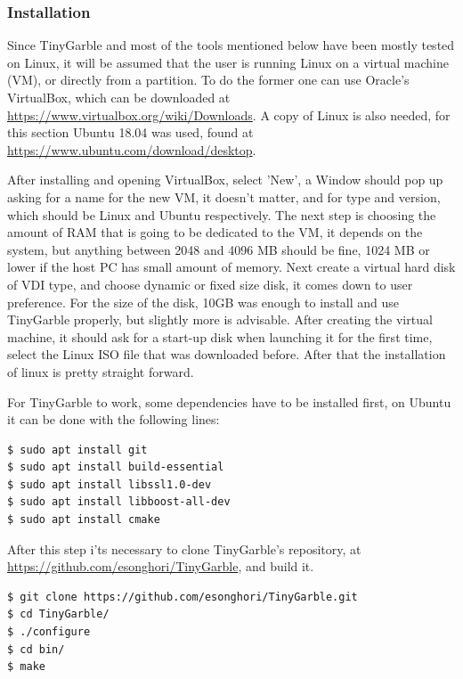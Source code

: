 \begin{refsection}
\subsubsection{Installation}

Since TinyGarble and most of the tools mentioned below have been mostly tested on Linux, it will be assumed that the user is running Linux on a virtual machine (VM), or directly from a partition. To do the former one can use Oracle's VirtualBox, which can be downloaded at \url{https://www.virtualbox.org/wiki/Downloads}. A copy of Linux is also needed, for this section Ubuntu 18.04 was used, found at \url{https://www.ubuntu.com/download/desktop}.

After installing and opening VirtualBox, select 'New', a Window should pop up asking for a name for the new VM, it doesn't matter, and for type and version, which should be Linux and Ubuntu respectively. The next step is choosing the amount of RAM that is going to be dedicated to the VM,  it depends on the system, but anything between 2048 and 4096 MB should be fine, 1024 MB or lower if the host PC has small amount of memory. Next create a virtual hard disk of VDI type, and choose dynamic or fixed size disk, it comes down to user preference. For the size of the disk, 10GB was enough to install and use TinyGarble properly, but slightly more is advisable.
After creating the virtual machine, it should ask for a start-up disk when launching it for the first time, select the Linux ISO file that was downloaded before. After that the installation of linux is pretty straight forward.

For TinyGarble to work, some dependencies have to be installed first, on Ubuntu it can be done with the following lines:

\begin{lstlisting}[caption={Installation of TinyGarble's dependencies}, language=bash, captionpos=b] 
$ sudo apt install git
$ sudo apt install build-essential
$ sudo apt install libssl1.0-dev
$ sudo apt install libboost-all-dev
$ sudo apt install cmake
\end{lstlisting}

After this step i'ts necessary to clone TinyGarble's repository, at \url{https://github.com/esonghori/TinyGarble}, and build it.

\begin{lstlisting}[caption={Configuration and compilation of TinyGarble}, language=bash, captionpos=b] 
$ git clone https://github.com/esonghori/TinyGarble.git
$ cd TinyGarble/
$ ./configure
$ cd bin/
$ make
\end{lstlisting}


\end{refsection}
